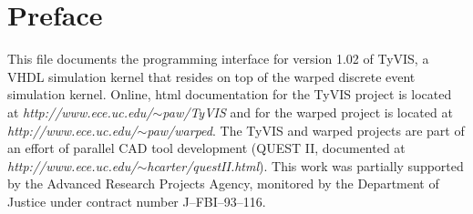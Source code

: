 \documentclass[11pt]{article}
\newcommand{\version}{1.02}
\begin{document}
\section*{Preface}
This file documents the programming interface for version \version\/ of
TyVIS, a VHDL simulation kernel that resides on top of the {\sc warped}
discrete event simulation kernel.  Online, html documentation for the
TyVIS project is located at {\it http://www.ece.uc.edu/$\sim$paw/TyVIS} and
for the {\sc warped} project is located at
{\it http://www.ece.uc.edu/$\sim$paw/warped}.  The TyVIS and {\sc warped}
projects are part of an effort of parallel CAD tool development (QUEST
II, documented at {\it http://www.ece.uc.edu/$\sim$hcarter/questII.html}).
This work was partially supported by the Advanced Research Projects
Agency, monitored by the Department of Justice under contract number
J--FBI--93--116.

\newpage

\newcommand{\Cpp}{C$^{_{++}}$}
\newcommand{\ie}{\emph{i.e.,}\xspace}
\newcommand{\etal}{\mbox{\emph{et al}\xspace}}
\newcommand{\eg}{\mbox{\emph{e.g.,}\xspace}}
\newcommand{\cross}{\ensuremath{\times}}

\newcommand{\warped}{{\sc warped}}
\newcommand{\tyvis}{TyVIS}
\newcommand{\LrmRef}[1]{(See \mbox{\S~#1})}
\newcommand{\LRM}{\textit{VHDL LRM 1076-1993}~\cite{vhdl-lrm-93}}
\newcommand{\A}{\ensuremath{\mathcal{A}}}
\newcommand{\B}{\ensuremath{\mathcal{B}}}
\newcommand{\T}{\ensuremath{\mathcal{T}}}
\renewcommand{\O}{\ensuremath{\mathcal{O}}}

\newlength{\figurewidth}
\setlength{\figurewidth}{\textwidth}

%
% 

\newcommand{\example}[3]{
  \begin{center}
      \begin{figure}[htbp]
        \framebox[\figurewidth]{
          \begin{minipage}{\figurewidth}
            \begin{alltt}
              \begin{tabbing}
                1234\=1234\=1234\=1234\=1234\=1234\=\kill
                #3
              \end{tabbing}
            \end{alltt}
          \end{minipage}
          }
        \caption{#2}
        \label{#1}
      \end{figure}
  \end{center}
  }
\end{document}
